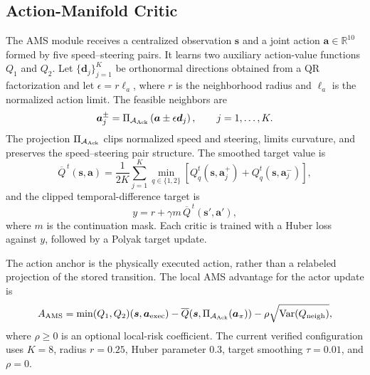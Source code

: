 \documentclass[lettersize,journal]{IEEEtran}
\newcommand{\R}{\mathbb{R}}
\newcommand{\vect}[1]{\boldsymbol{#1}}
\begin{document}
\subsection{Action-Manifold Critic}
The AMS module receives a centralized observation $\vect{s}$ and a joint action $\vect{a}\in\R^{10}$ formed by five speed--steering pairs. It learns two auxiliary action-value functions $Q_1$ and $Q_2$. Let $\{\vect{d}_j\}_{j=1}^{K}$ be orthonormal directions obtained from a QR factorization and let $\epsilon=r\ell_a$, where $r$ is the neighborhood radius and $\ell_a$ is the normalized action limit. The feasible neighbors are
\begin{equation}
\vect{a}_{j}^{\pm}
=\Pi_{\mathcal{A}_{\rm Ack}}
\left(\vect{a}\pm\epsilon\vect{d}_j\right),
\qquad j=1,\ldots,K.
\label{eq:neighbors}
\end{equation}
The projection $\Pi_{\mathcal{A}_{\rm Ack}}$ clips normalized speed and steering, limits curvature, and preserves the speed--steering pair structure. The smoothed target value is
\begin{equation}
\overline{Q}^{\,t}(\vect{s},\vect{a})
=\frac{1}{2K}\sum_{j=1}^{K}
\min_{q\in\{1,2\}}
\left[
Q_q^{t}(\vect{s},\vect{a}_{j}^{+})
+Q_q^{t}(\vect{s},\vect{a}_{j}^{-})
\right],
\label{eq:smooth_q}
\end{equation}
and the clipped temporal-difference target is
\begin{equation}
y=r+\gamma m\,\overline{Q}^{\,t}(\vect{s}',\vect{a}'),
\label{eq:ams_target}
\end{equation}
where $m$ is the continuation mask. Each critic is trained with a Huber loss against $y$, followed by a Polyak target update.

The action anchor is the physically executed action, rather than a relabeled projection of the stored transition. The local AMS advantage for the actor update is
\begin{equation}
A_{\rm AMS}
=\min(Q_1,Q_2)(\vect{s},\vect{a}_{\rm exec})
-\overline{Q}(\vect{s},\Pi_{\mathcal{A}_{\rm Ack}}(\vect{a}_{\pi}))
-\rho\sqrt{\operatorname{Var}(Q_{\rm neigh})},
\label{eq:ams_advantage}
\end{equation}
where $\rho\geq 0$ is an optional local-risk coefficient. The current verified configuration uses $K=8$, radius $r=0.25$, Huber parameter 0.3, target smoothing $\tau=0.01$, and $\rho=0$.
\end{document}
